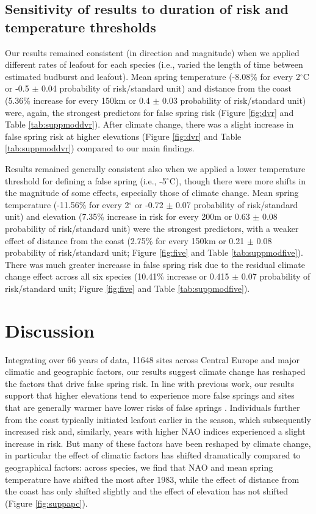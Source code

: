 \documentclass{article}\usepackage[]{graphicx}\usepackage[]{color}
\begin{document}
\subsection*{Sensitivity of results to duration of risk and temperature thresholds}
Our results remained consistent (in direction and magnitude) when we applied different rates of leafout for each species (i.e., varied the length of time between estimated budburst and leafout). Mean spring temperature (-8.08\% for every 2$^\circ$C or -0.5 $\pm$ 0.04 probability of risk/standard unit) and distance from the coast (5.36\% increase for every 150km or 0.4 $\pm$ 0.03 probability of risk/standard unit) were, again, the strongest predictors for false spring risk (Figure \ref{fig:dvr} and Table \ref{tab:suppmoddvr}). After climate change, there was a slight increase in false spring risk at higher elevations (Figure \ref{fig:dvr} and Table \ref{tab:suppmoddvr}) compared to our main findings. 

Results remained generally consistent also when we applied a lower temperature threshold for defining a false spring (i.e., -5$^{\circ}$C), though there were more shifts in the magnitude of some effects, especially those of climate change. Mean spring temperature (-11.56\% for every 2$^\circ$ or -0.72 $\pm$ 0.07 probability of risk/standard unit) and elevation (7.35\% increase in risk for every 200m or 0.63 $\pm$ 0.08 probability of risk/standard unit) were the strongest predictors, with a weaker effect of distance from the coast (2.75\% for every 150km or 0.21 $\pm$ 0.08 probability of risk/standard unit; Figure \ref{fig:five} and Table \ref{tab:suppmodfive}). There was much greater increasse in false spring risk due to the residual climate change effect across all six species (10.41\% increase or 0.415 $\pm$ 0.07 probability of risk/standard unit; Figure \ref{fig:five} and Table \ref{tab:suppmodfive}). 

\section*{Discussion}
Integrating over 66 years of data, 11648 sites across Central Europe and major climatic and geographic factors, our results suggest climate change has reshaped the factors that drive false spring risk. In line with previous work, our results support that higher elevations tend to experience more false springs \citep{Vitasse2018, Vitra2017} and sites that are generally warmer have lower risks of false springs \citep{Wypych2016}. Individuals further from the coast typically initiated leafout earlier in the season, which subsequently increased risk and, similarly, years with higher NAO indices experienced a slight increase in risk. But many of these factors have been reshaped by climate change, in particular the effect of climatic factors has shifted dramatically compared to geographical factors: across species, we find that NAO and mean spring temperature have shifted the most after 1983, while the effect of distance from the coast has only shifted slightly and the effect of elevation has not shifted (Figure \ref{fig:suppapc}). 
\end{document}
